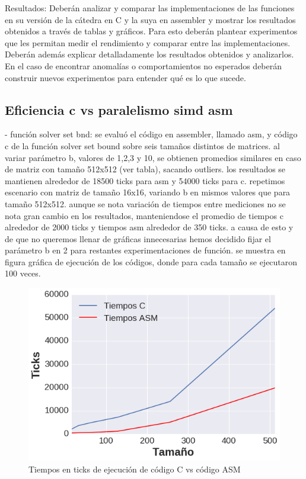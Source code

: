 Resultados: Deberán analizar y comparar las implementaciones de las funciones en su versión de la cátedra en C y la suya en assembler y mostrar los resultados obtenidos a través de tablas y gráficos. Para esto deberán plantear experimentos que les permitan medir el rendimiento y comparar entre las implementaciones. Deberán además explicar detalladamente los resultados obtenidos y analizarlos. En el caso de encontrar anomalías o comportamientos no esperados deberán construir nuevos experimentos para entender qué es lo que sucede.

\subsection{Eficiencia c vs paralelismo simd asm}
- función solver set bnd:
se evaluó el código en assembler, llamado asm, y código c de la función solver set bound sobre seis tamaños distintos de matrices. al variar parámetro b, valores de 1,2,3 y 10, se obtienen promedios similares en caso de matriz con tamaño 512x512 (ver tabla), sacando outliers. los resultados se mantienen alrededor de 18500 ticks para asm y 54000 ticks para c. 
repetimos escenario con matriz de tamaño 16x16, variando b en mismos valores que para tamaño 512x512. aunque se nota 
variación de tiempos entre mediciones no se nota gran cambio en los resultados, manteniendose el promedio de tiempos c alrededor de 2000 ticks y tiempos asm alrededor de 350 ticks.
a causa de esto y de que no queremos llenar de gráficas innecesarias hemos decidido fijar el parámetro b en 2 para restantes experimentaciones de función. 
se muestra en figura gráfica de ejecución de los códigos, donde para cada tamaño se ejecutaron 100 veces.

\begin{figure}[h]
\centering
\includegraphics[scale=0.4] {grafC}
\caption{Tiempos en ticks de ejecución de código C vs código ASM}
\end{figure}



